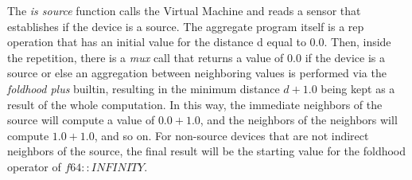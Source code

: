 The \textit{is source} function calls the Virtual Machine and reads a sensor that establishes if the device is a source.
The aggregate program itself is a rep operation that has an initial value for the distance d equal to $0.0$.
Then, inside the repetition, there is a \textit{mux} call that returns a value of $0.0$ if the device is a source or else an aggregation between neighboring values is performed via the \textit{foldhood plus} builtin, resulting in the minimum distance $d + 1.0$ being kept as a result of the whole computation.
In this way, the immediate neighbors of the source will compute a value of $0.0 + 1.0$, and the neighbors of the neighbors will compute $1.0 + 1.0$, and so on.
For non-source devices that are not indirect neighbors of the source, the final result will be the starting value for the foldhood operator of $f64::INFINITY$.